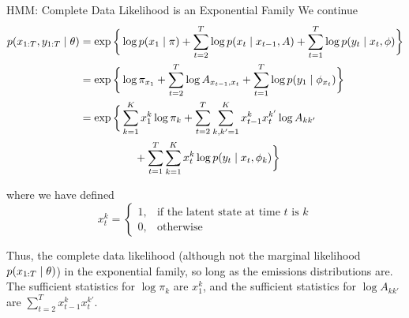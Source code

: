 \documentclass[10pt]{beamer}
\begin{document}
\begin{frame}{HMM: Complete Data Likelihood is an Exponential Family}
We continue 
 \footnotesize
\begin{align}
p(x_{1:T}, y_{1:T} \; | \; \theta) &=  \exp\bigg \{ \log p(x_1 \; | \; \pi) + \displaystyle\sum_{t=2}^T \log p(x_t \; | \; x_{t-1}, A) +  \displaystyle\sum_{t=1}^T \log p(y_t \; | \; x_t, \phi) \bigg\}  \nonumber \\
&= \exp \bigg \{ \log \pi_{x_1}  + \displaystyle\sum_{t=2}^T \log A_{x_{t-1}, x_t} + \displaystyle\sum_{t=1}^T \log p(y_1 \; | \; \phi_{x_t}) \bigg\} \label{eqn:hmm_cdl_ef_compact} \\
&=  \exp\bigg \{  \displaystyle\sum_{k=1}^K x_1^k \log \pi_k + \displaystyle\sum_{t=2}^T \displaystyle\sum_{k, k'=1}^K x_{t-1}^k x_t^{k'} \log A_{kk'} \nonumber \\ 
&\quad\quad\quad\quad\quad  + \displaystyle\sum_{t=1}^T \displaystyle\sum_{k=1}^K x_t^k \log p(y_t \; | \; x_t, \phi_k)  \bigg\} \label{eqn:hmm_ef_form}
\end{align}

\tiny where we have defined
\[ x_t^k =  
\begin{cases}	  
1, & \text{if the latent state at time $t$ is $k$} \\
0, & \text{otherwise}
\end{cases} \]

\vfill
 \footnotesize

Thus, the complete data likelihood \tiny (although not the marginal  likelihood $p(x_{1:T} \; | \; \theta)$) \footnotesize in the exponential family, so long as the emissions distributions are.   The sufficient statistics for $\log \pi_k$ are $x_1^k$, and the sufficient statistics for $\log A_{kk'}$ are $\sum_{t=2}^T x_{t-1}^k x_t^{k'}$.

\end{frame}
\end{document}
